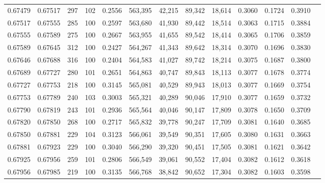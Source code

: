 \begin{tabular}{rrrrrrrrrrrrr}
0.67479 & 0.67517 &   297 & 102 &                                     0.2556 & 563,395 &  42,215 &  89,342 &  18,614 & 0.3060 & 0.1724 & 0.3910 \\
0.67517 & 0.67555 &   285 & 100 &                                     0.2597 & 563,680 &  41,930 &  89,442 &  18,514 & 0.3063 & 0.1715 & 0.3884 \\
0.67555 & 0.67589 &   275 & 100 &                                     0.2667 & 563,955 &  41,655 &  89,542 &  18,414 & 0.3065 & 0.1706 & 0.3859 \\
0.67589 & 0.67645 &   312 & 100 &                                     0.2427 & 564,267 &  41,343 &  89,642 &  18,314 & 0.3070 & 0.1696 & 0.3830 \\
0.67646 & 0.67688 &   316 & 100 &                                     0.2404 & 564,583 &  41,027 &  89,742 &  18,214 & 0.3075 & 0.1687 & 0.3800 \\
0.67689 & 0.67727 &   280 & 101 &                                     0.2651 & 564,863 &  40,747 &  89,843 &  18,113 & 0.3077 & 0.1678 & 0.3774 \\
0.67727 & 0.67753 &   218 & 100 &                                     0.3145 & 565,081 &  40,529 &  89,943 &  18,013 & 0.3077 & 0.1669 & 0.3754 \\
0.67753 & 0.67789 &   240 & 103 &                                     0.3003 & 565,321 &  40,289 &  90,046 &  17,910 & 0.3077 & 0.1659 & 0.3732 \\
0.67790 & 0.67819 &   243 & 101 &                                     0.2936 & 565,564 &  40,046 &  90,147 &  17,809 & 0.3078 & 0.1650 & 0.3709 \\
0.67820 & 0.67850 &   268 & 100 &                                     0.2717 & 565,832 &  39,778 &  90,247 &  17,709 & 0.3081 & 0.1640 & 0.3685 \\
0.67850 & 0.67881 &   229 & 104 &                                     0.3123 & 566,061 &  39,549 &  90,351 &  17,605 & 0.3080 & 0.1631 & 0.3663 \\
0.67881 & 0.67923 &   229 & 100 &                                     0.3040 & 566,290 &  39,320 &  90,451 &  17,505 & 0.3081 & 0.1621 & 0.3642 \\
0.67925 & 0.67956 &   259 & 101 &                                     0.2806 & 566,549 &  39,061 &  90,552 &  17,404 & 0.3082 & 0.1612 & 0.3618 \\
0.67956 & 0.67985 &   219 & 100 &                                     0.3135 & 566,768 &  38,842 &  90,652 &  17,304 & 0.3082 & 0.1603 & 0.3598 \\

\end{tabular}
